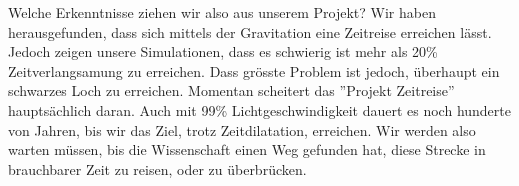 \begin{refsection}
	Welche Erkenntnisse ziehen wir also aus unserem Projekt?
	Wir haben herausgefunden, dass sich mittels der Gravitation eine Zeitreise erreichen lässt. Jedoch zeigen unsere Simulationen, dass es schwierig ist mehr als 20\% Zeitverlangsamung zu erreichen. Dass grösste Problem ist jedoch, überhaupt ein schwarzes Loch zu erreichen. Momentan scheitert das ''Projekt Zeitreise'' hauptsächlich daran. Auch mit 99\% Lichtgeschwindigkeit dauert es noch hunderte von Jahren, bis wir das Ziel, trotz Zeitdilatation, erreichen. Wir werden also warten müssen, bis die Wissenschaft einen Weg gefunden hat, diese Strecke in brauchbarer Zeit zu reisen, oder zu überbrücken. %
    
	\printbibliography[heading=subbibliography]
	\end{refsection}

